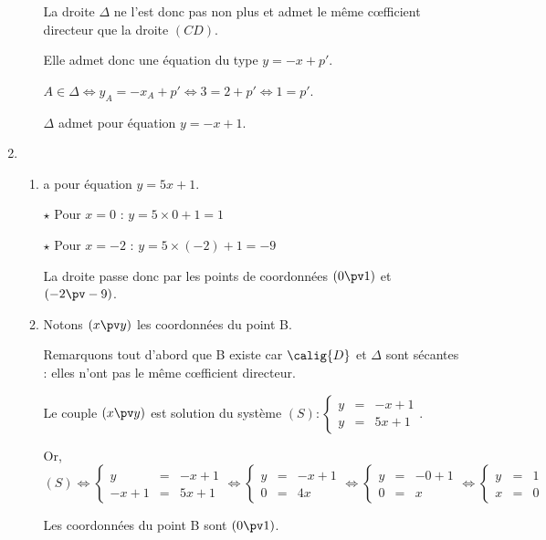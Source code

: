 \documentclass[10pt,french]{article}
\begin{document}
\begin{enumerate}[label=\arabic*.]
\begin{enumerate}[label=\alph*)]
	La droite $\Delta$ ne l'est donc pas non plus et admet le même c\oe{}fficient directeur que la droite $(CD)$.
	
	Elle admet donc une équation du type $y=-x+p'$.
	
	$A\in \Delta\Leftrightarrow y_A=-x_A+p'\Leftrightarrow 3=2+p'\Leftrightarrow 1=p'$.
	
	$\Delta$ admet pour équation $y=-x+1$.
		
	\end{enumerate}

\item 	\begin{enumerate}[label=\alph*)]
	\item {} a pour équation $y=5x+1$.
	
	$\star$ Pour $x=0$ : $y=5\times 0+1=1$
	
	$\star$ Pour $x=-2$ : $y=5\times (-2)+1=-9$
	
	La droite  passe donc par les points de coordonnées $(0\pv 1)$ et $(-2\pv -9)$.
	
	\item Notons $(x\pv y)$ les coordonnées du point B.
	
	Remarquons tout d'abord que B existe car $\calig{D}$ et $\Delta$ sont sécantes : elles n'ont pas le même c\oe{}fficient directeur.
	
	Le couple $(x\pv y)$ est solution du système $(S) : \left\{\begin{array}{rcl}
	y&=&-x+1\\
	y&=&5x+1
	\end{array}\right.
	$.
	
	Or, $(S)\Leftrightarrow \left\{\begin{array}{rcl}
	y&=&-x+1\\
	-x+1&=&5x+1
	\end{array}\right.\Leftrightarrow \left\{\begin{array}{rcl}
	y&=&-x+1\\
	0&=&4x
	\end{array}\right.\Leftrightarrow\left\{\begin{array}{rcl}
	y&=&-0+1\\
	0&=&x
	\end{array}\right.\Leftrightarrow \left\{\begin{array}{rcl}
	y&=&1\\
	x&=&0
	\end{array}\right.$
	
	Les coordonnées du point B sont $(0\pv 1)$.
	

\end{enumerate}
\end{enumerate}
\end{document}
